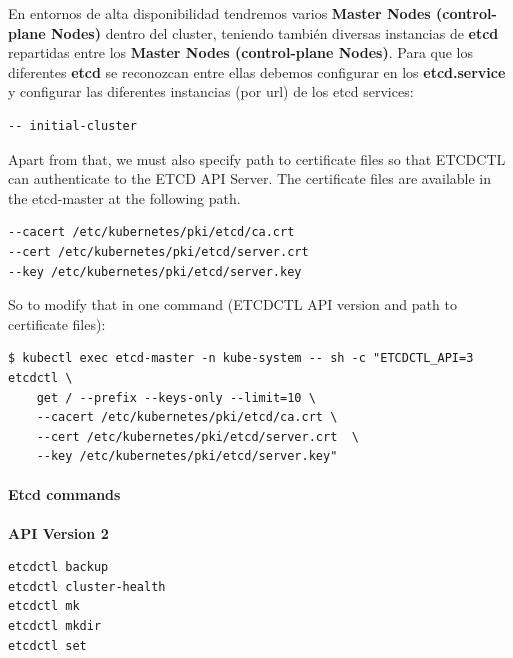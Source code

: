 \documentclass{article}
\newenvironment{codetemplate}[1][]{%
  \mybasecolorbox[#1]
  \itshape
}{%
  \endmybasecolorbox
}
\begin{document}
En entornos de alta disponibilidad tendremos varios \textbf{Master Nodes (control-plane Nodes)} dentro del cluster, teniendo también diversas instancias de \textbf{etcd} repartidas entre los \textbf{Master Nodes (control-plane Nodes)}. Para que los diferentes \textbf{etcd} se reconozcan entre ellas debemos configurar en los \textbf{etcd.service} y configurar las diferentes instancias (por url) de los etcd services:

\begin{codetemplate}{}
\begin{verbatim}
-- initial-cluster
\end{verbatim}
\end{codetemplate}

Apart from that, we must also specify path to certificate files so that ETCDCTL can authenticate to the ETCD API Server. The certificate files are available in the etcd-master at the following path. 

\begin{codetemplate}{}
\begin{verbatim}
--cacert /etc/kubernetes/pki/etcd/ca.crt     
--cert /etc/kubernetes/pki/etcd/server.crt     
--key /etc/kubernetes/pki/etcd/server.key
\end{verbatim}
\end{codetemplate}

So to modify that in one command (ETCDCTL API version and path to certificate files):

\begin{codetemplate}{}
\begin{verbatim}
$ kubectl exec etcd-master -n kube-system -- sh -c "ETCDCTL_API=3 etcdctl \ 
    get / --prefix --keys-only --limit=10 \
    --cacert /etc/kubernetes/pki/etcd/ca.crt \
    --cert /etc/kubernetes/pki/etcd/server.crt  \
    --key /etc/kubernetes/pki/etcd/server.key"
\end{verbatim}
\end{codetemplate}

\paragraph{Etcd commands}

\textbf{API Version 2}

\begin{codetemplate}{}
\begin{verbatim}
etcdctl backup
etcdctl cluster-health
etcdctl mk
etcdctl mkdir
etcdctl set
\end{verbatim}
\end{codetemplate}
\end{document}
